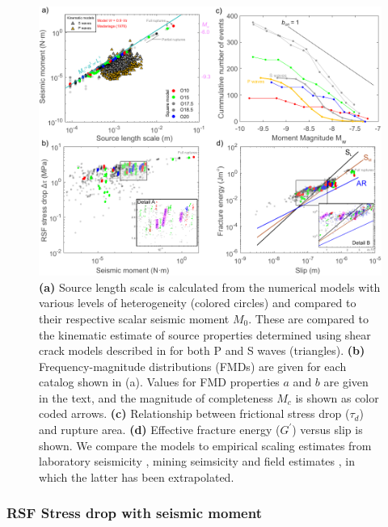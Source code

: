 \documentclass[draft]{agujournal2019}
\begin{document}
\begin{figure}
	\centering
	\includegraphics[scale = 0.95]{FIG10.pdf} 
	\caption{\textbf{(a)} Source length scale is calculated from the numerical models with various levels of heterogeneity (colored circles) and compared to their respective scalar seismic moment $M_{0}$. These are compared to the kinematic estimate of source properties determined using shear crack models described in  for both P and S waves (triangles). \textbf{(b)} Frequency-magnitude distributions (FMDs) are given for each catalog shown in (a).  Values for FMD properties $a$ and $b$ are given in the text, and the magnitude of completeness $M_{c}$ is shown as color coded arrows. \textbf{(c)} Relationship between frictional stress drop ($\tau_{d}$) and rupture area. \textbf{(d)} Effective fracture energy ($G^{'}$) versus slip is shown. We compare the models to empirical scaling estimates from laboratory seismicity \cite<black line>{Selvadurai2019}, mining seimsicity \cite<brown line>{Selvadurai2019} and field estimates \cite<blue line>{Abercrombie2005}, in which the latter has been extrapolated.}
	\label{fig10}
\end{figure}

\subsubsection{RSF Stress drop with seismic moment}
\end{document}
